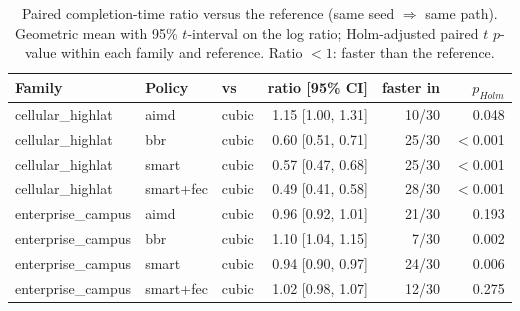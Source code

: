 \begin{table}[t]\centering\footnotesize
\caption{Paired completion-time ratio versus the reference (same seed $\Rightarrow$ same path). Geometric mean with 95\% $t$-interval on the log ratio; Holm-adjusted paired $t$ $p$-value within each family and reference. Ratio $<1$: faster than the reference.}
\label{tab:scalepaired}\begin{tabular}{lllrrr}\toprule
Family & Policy & vs & ratio [95\% CI] & faster in & $p_{Holm}$\\\midrule
cellular\_highlat & aimd & cubic & 1.15 [1.00, 1.31] & 10/30 & 0.048 \\
cellular\_highlat & bbr & cubic & 0.60 [0.51, 0.71] & 25/30 & $<$0.001 \\
cellular\_highlat & smart & cubic & 0.57 [0.47, 0.68] & 25/30 & $<$0.001 \\
cellular\_highlat & smart+fec & cubic & 0.49 [0.41, 0.58] & 28/30 & $<$0.001 \\
enterprise\_campus & aimd & cubic & 0.96 [0.92, 1.01] & 21/30 & 0.193 \\
enterprise\_campus & bbr & cubic & 1.10 [1.04, 1.15] & 7/30 & 0.002 \\
enterprise\_campus & smart & cubic & 0.94 [0.90, 0.97] & 24/30 & 0.006 \\
enterprise\_campus & smart+fec & cubic & 1.02 [0.98, 1.07] & 12/30 & 0.275 \\
\bottomrule\end{tabular}\end{table}
